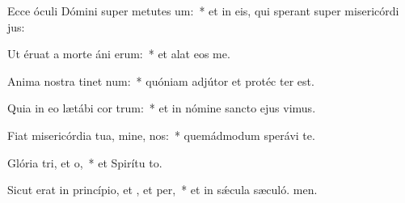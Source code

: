 \item Ecce óculi Dómini super metutes um:~* et in eis, qui sperant super misericórdi jus:
\item Ut éruat a morte áni erum:~* et alat eos  me.
\item Anima nostra tinet num:~* quóniam adjútor et protéc ter est.
\item Quia in eo lætábi cor trum:~* et in nómine sancto ejus vimus.
\item Fiat misericórdia tua, mine,  nos:~* quemádmodum sperávi  te.
\item Glória tri, et o,~* et Spirítu to.
\item Sicut erat in princípio, et , et per,~* et in sǽcula sæculó. men.
